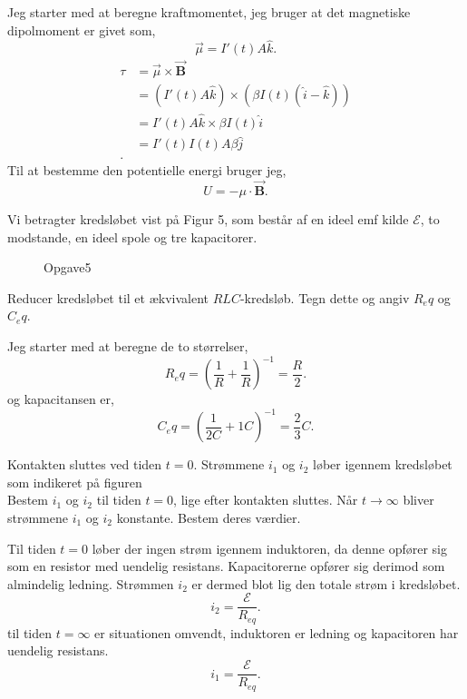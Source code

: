 \begin{solution}
Jeg starter med at beregne kraftmomentet, jeg bruger at det magnetiske dipolmoment er givet som,
\[
\vec{\mu} = I'\left( t \right) A\hat{k}
.\] 
\begin{align*}
	\tau &= \vec{\mu} \times \vec{\mathbf{B}} \\
	&= \left( I'\left( t \right) A\hat{k} \right) \times \left( \beta I\left( t \right) \left( \hat{i}-\hat{k} \right)  \right)  \\
	&= I'\left( t \right) A\hat{k} \times \beta I\left( t \right) \hat{i}\\
	&= I'\left( t \right) I\left( t \right) A\beta \hat{j} \\
.\end{align*}
Til at bestemme den potentielle energi bruger jeg,
\[
U = -\mu \cdot  \vec{\mathbf{B}} 
.\] 
\end{solution}
\begin{exercise}[Opgave 5]
Vi betragter kredsløbet vist på Figur 5, som består af en ideel emf kilde $\mathcal{E} $, to modstande, en ideel spole og tre kapacitorer.
\end{exercise}
\begin{figure}[ht]
    \centering
    \caption{Opgave5}
    \label{fig:opgave5}
\end{figure}
\begin{subexercise}[a]
Reducer kredsløbet til et ækvivalent $RLC$-kredsløb. Tegn dette og angiv $R_eq$ og $C_eq$.
\end{subexercise}
\begin{solution}
Jeg starter med at beregne de to størrelser,
\[
R_eq = \left( \frac{1}{R} + \frac{1}{R} \right) ^{-1} = \frac{R}{2}
.\] 
og kapacitansen er,
\[
C_eq = \left( \frac{1}{2C} + 1C \right)^{-1} = \frac{2}{3}C
.\]
\begin{figure}[ht]
    \centering
    \label{fig:opgave5a}
\end{figure}
\end{solution}
\begin{subexercise}[b]
	Kontakten sluttes ved tiden $t=0$. Strømmene $i_1$ og $i_2$ løber igennem kredsløbet som indikeret på figuren\\
	Bestem $i_1$ og $i_2$ til tiden $t=0$, lige efter kontakten sluttes. Når $t \to \infty$ bliver strømmene $i_1$ og $i_2$ konstante. Bestem deres værdier.
\end{subexercise}
\begin{solution}
Til tiden $t=0$ løber der ingen strøm igennem induktoren, da denne opfører sig som en resistor med uendelig resistans. Kapacitorerne opfører sig derimod som almindelig ledning. Strømmen $i_2$ er dermed blot lig den totale strøm i kredsløbet.
\[
	i_2 = \frac{\mathcal{E} }{R_{eq}} 
.\]
til tiden $t=\infty$ er situationen omvendt, induktoren er ledning og kapacitoren har uendelig resistans.
 \[
i_1 = \frac{\mathcal{E} }{R_{eq}}
.\] 
\end{solution}
